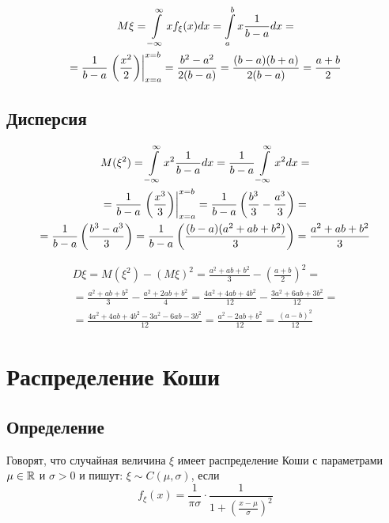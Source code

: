 \begin{multline}
M\xi =  \int\limits_{-\infty }^{\infty } xf_\xi(x) dx =
\int\limits_{a }^{b } x \frac{1}{b-a} dx =
\\=
\frac{1}{b-a} \left.  \left( \frac{x^2}{2} \right)   \right|_{ x=a}^{ x=b}=
\frac{b^2-a^2}{2(b-a)}=
\frac{(b-a)(b+a)}{2(b-a)}=
\frac{a+b}{2}
\end{multline}

\subsection{Дисперсия}
\begin{multline}
    M( \xi ^2) = 
    \int\limits_{-\infty }^{\infty } x^2 \frac{1}{b-a}dx =
    \frac{1}{b-a} \int\limits_{-\infty }^{\infty } x^2 dx =
    \\=
    \frac{1}{b-a}\left. \left( \frac{x^3}{3} \right)  \right|_{ x=a}^{ x=b} = 
    \frac{1}{b-a} \left( \frac{b^3}{3} - \frac{a^3}{3}\right) =
    \\=
    \frac{1}{b-a} \left( \frac{b^3 - a^3}{3} \right) = 
    \frac{1}{b-a} \left( \frac{(b-a)(a^2+ab+b^2)}{3} \right) = 
    \frac{a^2+ab+b^2}{3}
\end{multline}

\begin{multline}
	D\xi =
	M(\xi^2)-(M\xi)^2 = 
	\frac{a^2+ab+b^2}{3} - \left( \frac{a+b}{2} \right)^2  =
	\\=
	\frac{a^2+ab+b^2}{3} - \frac{a^2+2ab+b^2}{4} =  
	\frac{4a^2+4ab+4b^2}{12} - \frac{3a^2+6ab+3b^2}{12} = 
	\\= 
	\frac{4a^2+4ab+4b^2-3a^2-6ab-3b^2}{12}=  
	\frac{a^2 -2ab + b^2 }{12}=  
	\frac{(a-b)^2}{12}  
\end{multline}


\section{Распределение Коши}

\subsection{Определение}
Говорят, что случайная величина $\xi$ имеет распределение Коши с параметрами $\mu\in\mathbb{R}$ и $\sigma>0$ и пишут: $\xi\sim C(\mu,\sigma)$, если
\begin{equation}
f_\xi (x) = \frac{1}{\pi\sigma}\cdot \frac{1}{1+ \left( \frac{x-\mu}{\sigma} \right)  ^2}
\end{equation}

